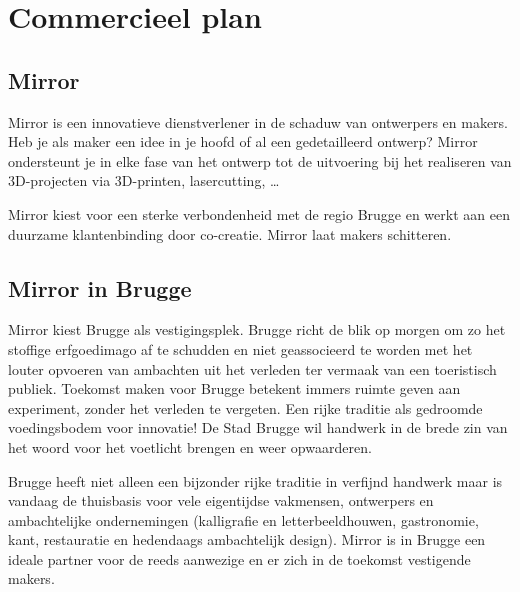 
\section{Commercieel plan} %
\label{sec:commercieel_plan}

\subsection{Mirror} %
\label{sub:mirror}
Mirror is een innovatieve dienstverlener in de schaduw van ontwerpers en makers. Heb je als maker een idee in je hoofd of al een gedetailleerd ontwerp? Mirror ondersteunt je in elke fase van het ontwerp tot de uitvoering bij het realiseren van 3D-projecten via 3D-printen, lasercutting, …

Mirror kiest voor een sterke verbondenheid met de regio Brugge en werkt aan een duurzame klantenbinding door co-creatie. Mirror laat makers schitteren.

\subsection{Mirror in Brugge} %
\label{sub:mirror_in_brugge}
Mirror kiest Brugge als vestigingsplek. Brugge richt de blik op morgen om zo het stoffige erfgoedimago af te schudden en niet geassocieerd te worden met het louter opvoeren van ambachten uit het verleden ter vermaak van een toeristisch publiek. Toekomst maken voor Brugge betekent immers ruimte geven aan experiment, zonder het verleden te vergeten. Een rijke traditie als gedroomde voedingsbodem voor innovatie! De Stad Brugge wil handwerk in de brede zin van het woord voor het voetlicht brengen en weer opwaarderen.\cite{blueprint-handmade}

Brugge heeft niet alleen een bijzonder rijke traditie in verfijnd handwerk maar is vandaag de thuisbasis voor vele eigentijdse vakmensen, ontwerpers en ambachtelijke ondernemingen (kalligrafie en letterbeeldhouwen, gastronomie, kant, restauratie en hedendaags ambachtelijk design). Mirror is in Brugge een ideale partner voor de reeds aanwezige en er zich in de toekomst vestigende makers.

